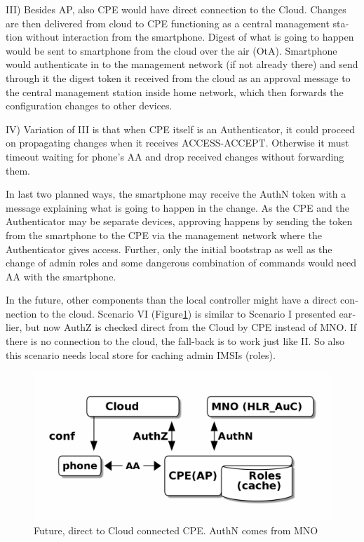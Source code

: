 \documentclass[12pt,a4paper,english]{tutthesis}
\begin{document}
\begin{otherlanguage}{english}
III) Besides AP, also CPE would have direct connection to the
   Cloud. Changes are then delivered from cloud to CPE functioning as a central
   management station without interaction from the smartphone.  Digest
   of what is going to happen would be sent to smartphone from the
   cloud over the air (OtA). Smartphone would authenticate in to the
   management network (if not already there) and send through it the
   digest token it received from the cloud as an approval message to
   the central management station inside home network, which then
   forwards the configuration changes to other devices.

IV) Variation of III is that when CPE itself is an Authenticator, it
   could proceed on propagating changes when it receives
   ACCESS-ACCEPT. Otherwise it must timeout waiting for phone's AA and
   drop received changes without forwarding them.


In last two planned ways, the smartphone may receive the AuthN token
with a message explaining what is going to happen in the change.  As
the CPE and the Authenticator may be separate devices, approving
happens by sending the token from the smartphone to the CPE via the
management network where the Authenticator gives access.  Further,
only the initial bootstrap as well as the change of admin roles and
some dangerous combination of commands would need AA with the
smartphone.


\label{scenario-iv} 
In the future, other components than  the  local controller might 
have a direct connection to the cloud. 
Scenario VI (Figure\ref{fig:scenario-VI}) is similar to Scenario I presented
earlier, but now AuthZ is checked direct from the Cloud by CPE instead of
MNO.  If there is no connection to the cloud, the fall-back is to work
just like II. So also this scenario needs local store for caching
admin IMSIs (roles).

\begin{figure}[htb]
\centering
\includegraphics[width=.9\linewidth]{scenVI.png}
\caption{\label{fig:scenario-VI}Future, direct to Cloud connected CPE. AuthN comes from MNO}
\end{figure}



\end{otherlanguage}
\end{document}
